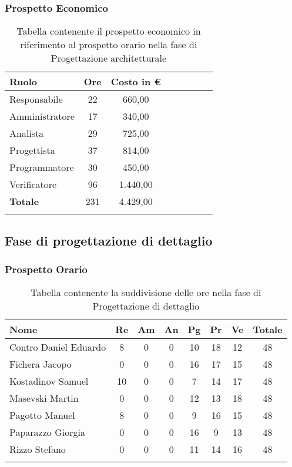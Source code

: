 \documentclass[../piano_di_progetto.tex]{subfiles}
\begin{document}
\subsubsection{Prospetto Economico}

\begin{center}
	\begin{longtable}{|l|c|c|c|c|c|c|c|}
		\hline
		\rowcolor{lightgray}
		\textbf{Ruolo} & \textbf{Ore} & \textbf{Costo in €}\\

		\hline
		Responsabile & 22 & 660,00\\
		\hline
		Amministratore & 17 & 340,00\\
		\hline
		Analista & 29 & 725,00\\
		\hline
		Progettista & 37 & 814,00\\
		\hline
		Programmatore & 30 & 450,00\\
		\hline
		Verificatore & 96 & 1.440,00\\
		\hline
		\textbf{Totale} & 231 & 4.429,00\\
		\hline
		\caption{Tabella contenente il prospetto economico in riferimento al prospetto orario nella fase di Progettazione architetturale}
	\end{longtable}
\end{center}

\subsection{ Fase di progettazione di dettaglio}%
\label{sub:fase_prog_dett}
\subsubsection{Prospetto Orario}

\begin{center}
	\begin{longtable}{|l|c|c|c|c|c|c|c|}
		\hline
		\rowcolor{lightgray}
		\textbf{Nome} & \textbf{Re} & \textbf{Am} & \textbf{An} & \textbf{Pg}  & \textbf{Pr}   & \textbf{Ve} & \textbf{Totale} \\

		\hline
			Contro Daniel Eduardo & 8 & 0 & 0 & 10 & 18 & 12 & 48 \\
		\hline
			Fichera Jacopo & 0 & 0 & 0 & 16 & 17 & 15 & 48 \\
		\hline
			Kostadinov Samuel & 10 & 0 & 0 & 7 & 14 & 17 & 48 \\			
		\hline
			Masevski Martin & 0 & 0 & 0 & 12 & 13 & 18 & 48 \\
		\hline
			Pagotto Manuel & 8 & 0 & 0 & 9 & 16 & 15 & 48 \\		
		\hline
			Paparazzo Giorgia & 0 & 0 & 0 & 16 & 9 & 13 & 48 \\
		\hline
			Rizzo Stefano & 0 & 0 & 0 & 11 & 14 & 16 & 48 \\
		\hline	

		\caption{Tabella contenente la suddivisione delle ore nella fase di Progettazione di dettaglio}
	\end{longtable}
\end{center}
\end{document}
